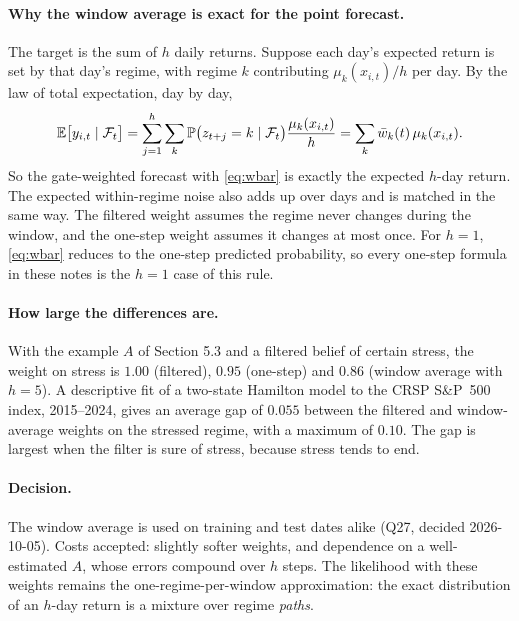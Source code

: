 \paragraph{Why the window average is exact for the point forecast.} The target is the sum of $h$ daily returns. Suppose each day's expected return is set by that day's regime, with regime $k$ contributing $\mu_k(x_{i,t})/h$ per day. By the law of total expectation, day by day,
\begin{equation}
\mathbb{E}\big[y_{i,t}\mid\mathcal{F}_t\big]=\sum_{j=1}^h\sum_k\mathbb P\big(z_{t+j}=k\mid\mathcal{F}_t\big)\frac{\mu_k(x_{i,t})}{h}=\sum_k\bar w_k(t)\,\mu_k(x_{i,t}).
\end{equation}
So the gate-weighted forecast with \eqref{eq:wbar} is exactly the expected $h$-day return. The expected within-regime noise also adds up over days and is matched in the same way. The filtered weight assumes the regime never changes during the window, and the one-step weight assumes it changes at most once. For $h=1$, \eqref{eq:wbar} reduces to the one-step predicted probability, so every one-step formula in these notes is the $h=1$ case of this rule.

\paragraph{How large the differences are.} With the example $A$ of Section 5.3 and a filtered belief of certain stress, the weight on stress is $1.00$ (filtered), $0.95$ (one-step) and $0.86$ (window average with $h=5$). A descriptive fit of a two-state Hamilton model to the CRSP S\&P~500 index, 2015--2024, gives an average gap of $0.055$ between the filtered and window-average weights on the stressed regime, with a maximum of $0.10$. The gap is largest when the filter is sure of stress, because stress tends to end.

\paragraph{Decision.} The window average is used on training and test dates alike (Q27, decided 2026-10-05). Costs accepted: slightly softer weights, and dependence on a well-estimated $A$, whose errors compound over $h$ steps. The likelihood with these weights remains the one-regime-per-window approximation: the exact distribution of an $h$-day return is a mixture over regime \emph{paths}.
\newpage
